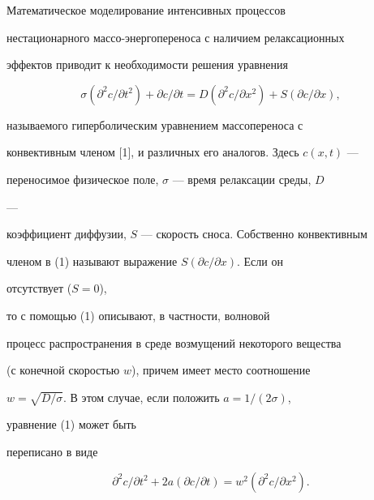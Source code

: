 \maketitle 


\label{begin} 


 


Математическое моделирование интенсивных процессов 


нестационарного массо-энер\-го\-пе\-ре\-но\-са с наличием релаксационных 


эффектов приводит к необходимости решения уравнения 


\begin{equation} 


\sigma(\partial^2c/\partial t^2)+\partial c/\partial t= 


D(\partial^2c/\partial x^2)+S(\partial c/\partial x), 


\end{equation} 


называемого гиперболическим уравнением массопереноса с 


конвективным членом [1], и различных его аналогов. Здесь $c(x,t)$ --- 


переносимое физическое поле, $\sigma$ --- время релаксации среды, $D$ 


--- 


коэффициент диффузии, $S$ --- скорость сноса. Собственно конвективным 


членом в (1) называют выражение $S(\partial c/\partial x)$. Если он 


отсутствует ($S=0$), 


то с помощью (1) описывают, в частности, волновой 


процесс распространения в среде возмущений некоторого вещества 


(с конечной скоростью $w$), причем имеет место соотношение 


$w=\sqrt{D/\sigma}$. В этом случае, если положить $a=1/(2\sigma)$, 


уравнение (1) может быть 


переписано в виде 


\begin{equation} 


\partial^2c/\partial t^2+2a(\partial c/\partial t)= 


w^2(\partial^2c/\partial x^2). 


\end{equation} 


